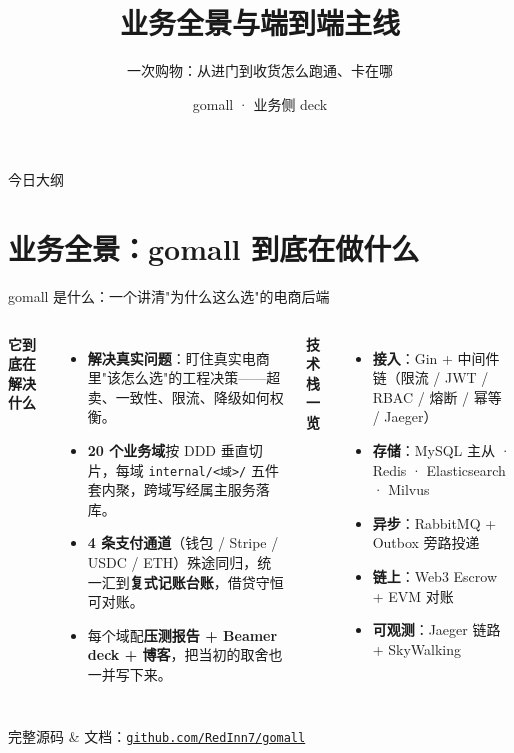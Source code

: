 \documentclass[aspectratio=169,11pt]{beamer}
\title{业务全景与端到端主线}
\subtitle{一次购物：从进门到收货怎么跑通、卡在哪}
\author{gomall · 业务侧 deck}
\institute{代码仓库：\href{https://github.com/RedInn7/gomall}{\texttt{github.com/RedInn7/gomall}}}
\date{}
\begin{document}
\maketitle

\begin{frame}[shrink]{今日大纲}
\tableofcontents
\end{frame}

\section{业务全景：gomall 到底在做什么}

\begin{frame}[shrink=12]{gomall 是什么：一个讲清"为什么这么选"的电商后端}
\vspace{0.3em}
\begin{columns}[T]
    \textbf{它到底在解决什么}
    \begin{itemize}\small
      \item \textbf{解决真实问题}：盯住真实电商里"该怎么选"的工程决策——超卖、一致性、限流、降级如何权衡。
      \item \textbf{20 个业务域}按 DDD 垂直切片，每域 \texttt{internal/<域>/} 五件套内聚，跨域写经属主服务落库。
      \item \textbf{4 条支付通道}（钱包 / Stripe / USDC / ETH）殊途同归，统一汇到\textbf{复式记账台账}，借贷守恒可对账。
      \item 每个域配\textbf{压测报告 + Beamer deck + 博客}，把当初的取舍也一并写下来。
    \end{itemize}
    \textbf{技术栈一览}
    \begin{itemize}\small
      \item \textbf{接入}：Gin + 中间件链（限流 / JWT / RBAC / 熔断 / 幂等 / Jaeger）
      \item \textbf{存储}：MySQL 主从 · Redis · Elasticsearch · Milvus
      \item \textbf{异步}：RabbitMQ + Outbox 旁路投递
      \item \textbf{链上}：Web3 Escrow + EVM 对账
      \item \textbf{可观测}：Jaeger 链路 + SkyWalking
    \end{itemize}
\end{columns}
\vspace{0.3em}
{\centering\small 完整源码 \& 文档：\href{https://github.com/RedInn7/gomall}{\texttt{github.com/RedInn7/gomall}}\par}
\end{frame}
\end{document}
